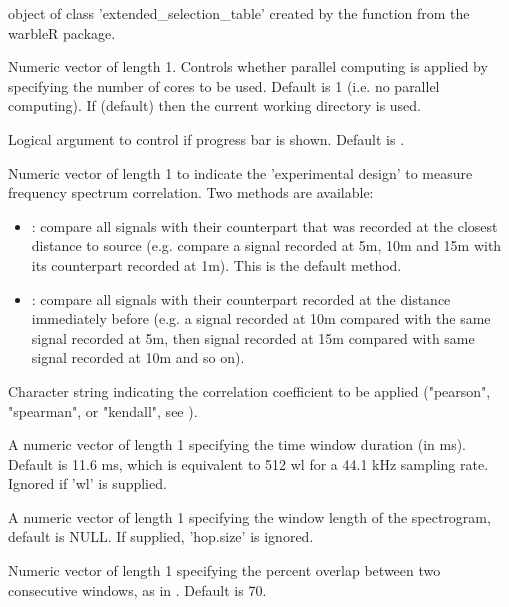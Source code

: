 \documentclass[letterpaper]{book}
\begin{document}
\begin{Arguments}
\begin{ldescription}
\item[\code{X}] object of class 'extended\_selection\_table' created by the function  from the warbleR package.

\item[\code{parallel}] Numeric vector of length 1. Controls whether parallel computing is applied by specifying the number of cores to be used. Default is 1 (i.e. no parallel computing).
If  (default) then the current working directory is used.

\item[\code{pb}] Logical argument to control if progress bar is shown. Default is .

\item[\code{method}] Numeric vector of length 1 to indicate the 'experimental design' to measure frequency spectrum correlation. Two methods are available:
\begin{itemize}

\item{} : compare all signals with their counterpart that was recorded at the closest distance to source (e.g. compare a signal recorded at 5m, 10m and 15m with its counterpart recorded at 1m). This is the default method. 
\item{} : compare all signals with their counterpart recorded at the distance immediately before (e.g. a signal recorded at 10m compared with the same signal recorded at 5m, then signal recorded at 15m compared with same signal recorded at 10m and so on).

\end{itemize}


\item[\code{cor.method}] Character string indicating the correlation coefficient to be applied ("pearson", "spearman", or "kendall", see ).

\item[\code{hop.size}] A numeric vector of length 1 specifying the time window duration (in ms). Default is 11.6 ms, which is equivalent to 512 wl for a 44.1 kHz sampling rate. Ignored if 'wl' is supplied.

\item[\code{wl}] A numeric vector of length 1 specifying the window length of the spectrogram, default 
is NULL. If supplied, 'hop.size' is ignored.

\item[\code{ovlp}] Numeric vector of length 1 specifying the percent overlap between two 
consecutive windows, as in . Default is 70.
\end{ldescription}
\end{Arguments}
\end{document}
